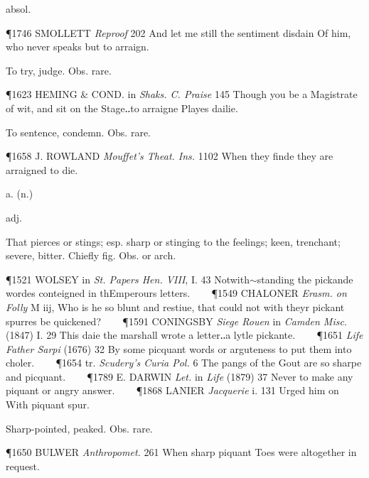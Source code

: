 \begin{description}[wide, labelwidth=!, labelindent=0pt]
\begin{myenumerate}
 absol.

\P 1746 SMOLLETT  \textit{Reproof} 202 And let me still the sentiment disdain Of him, who never speaks but to arraign.

 To try, judge. Obs. rare.

\P 1623 HEMING \& COND.  in \textit{Shaks. C. Praise} 145 Though you be a Magistrate of wit, and sit on the Stage‥to arraigne Playes dailie.

 To sentence, condemn. Obs. rare.

\P 1658 J. ROWLAND  \textit{Mouffet's Theat. Ins.} 1102 When  they finde they are arraigned to die.
\end{myenumerate}


 a. (n.)

\noindent {}

\vspace{-0.3cm}

\begin{myenumerate}

 adj.

 That pierces or stings; esp. sharp or stinging to the feelings; keen, trenchant; severe, bitter. Chiefly fig. Obs. or arch.

\P 1521 WOLSEY in  \textit{St. Papers Hen. VIII}, I. 43 Notwith$\sim$standing the pickande wordes conteigned in thEmperours letters.    
\P 1549 CHALONER  \textit{Erasm. on Folly} M iij, Who is he so blunt and restiue, that could not with theyr pickant spurres be quickened?    
\P 1591 CONINGSBY  \textit{Siege Rouen} in \textit{Camden Misc.} (1847) I. 29 This daie the marshall wrote a letter‥a lytle pickante.    
\P 1651  \textit{Life Father Sarpi} (1676) 32 By some picquant words or arguteness to put them into choler.    
\P 1654 tr.  \textit{Scudery's Curia Pol.} 6 The pangs of the Gout are so sharpe and picquant.    
\P 1789 E. DARWIN  \textit{Let.} in \textit{Life} (1879) 37 Never to make any piquant or angry answer.    
\P 1868 LANIER  \textit{Jacquerie} i. 131 Urged him on With piquant spur.

 Sharp-pointed, peaked. Obs. rare.

\P 1650 BULWER  \textit{Anthropomet.} 261 When sharp piquant Toes were altogether in request.


\end{myenumerate}
\end{description}
